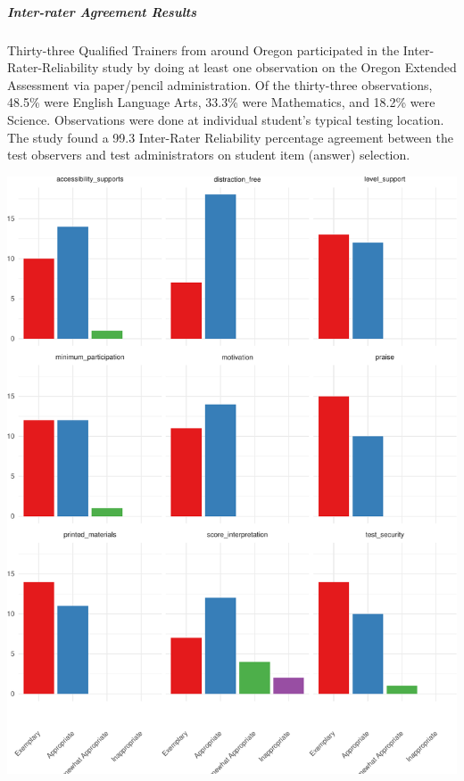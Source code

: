 \documentclass[]{article}
\let\oldsubparagraph\subparagraph
\renewcommand{\subparagraph}[1]{\oldsubparagraph{#1}\mbox{}}
\begin{document}
\FloatBarrier

\subparagraph{Inter-rater Agreement
Results}\label{inter-rater-agreement-results}

Thirty-three Qualified Trainers from around Oregon participated in the
Inter-Rater-Reliability study by doing at least one observation on the
Oregon Extended Assessment via paper/pencil administration. Of the
thirty-three observations, 48.5\% were English Language Arts, 33.3\%
were Mathematics, and 18.2\% were Science. Observations were done at
individual student's typical testing location. The study found a 99.3
Inter-Rater Reliability percentage agreement between the test observers
and test administrators on student item (answer) selection.

\FloatBarrier
\includegraphics{tech_report_18_files/figure-latex/unnamed-chunk-1-1.pdf}
\end{document}
